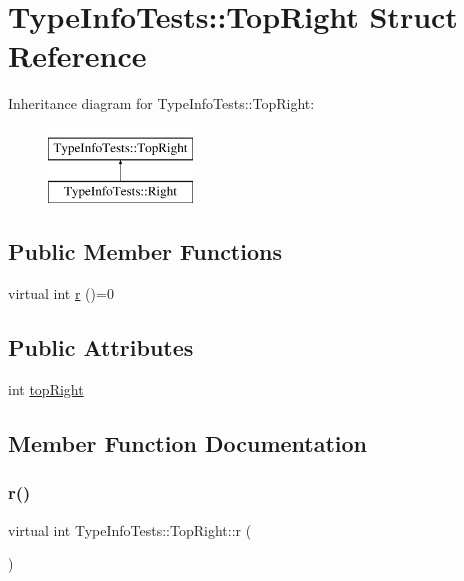 \hypertarget{structTypeInfoTests_1_1TopRight}{}\section{Type\+Info\+Tests\+::Top\+Right Struct Reference}
\label{structTypeInfoTests_1_1TopRight}
Inheritance diagram for Type\+Info\+Tests\+::Top\+Right\+:\begin{figure}[H]
\begin{center}
\leavevmode
\includegraphics[height=2.000000cm]{structTypeInfoTests_1_1TopRight}
\end{center}
\end{figure}
\subsection*{Public Member Functions}
\begin{DoxyCompactItemize}
\item 
virtual int \mbox{\hyperlink{structTypeInfoTests_1_1TopRight_af9b534118679084c831b0e6e9b373109}{r}} ()=0
\end{DoxyCompactItemize}
\subsection*{Public Attributes}
\begin{DoxyCompactItemize}
\item 
int \mbox{\hyperlink{structTypeInfoTests_1_1TopRight_a3525d425702ffa402688a521dcf9903f}{top\+Right}}
\end{DoxyCompactItemize}


\subsection{Member Function Documentation}
\mbox{\label{structTypeInfoTests_1_1TopRight_af9b534118679084c831b0e6e9b373109}} 
\subsubsection{\texorpdfstring{r()}{r()}}
{\footnotesize\ttfamily virtual int Type\+Info\+Tests\+::\+Top\+Right\+::r (\begin{DoxyParamCaption}{ }\end{DoxyParamCaption})\hspace{0.3cm}{\ttfamily [pure virtual]}}



